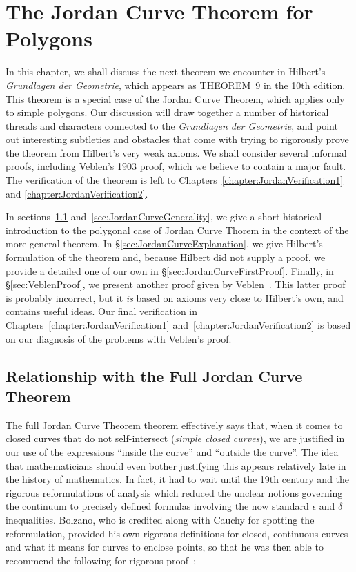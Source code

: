 \chapter{The Jordan Curve Theorem for Polygons}\label{chapter:JordanInformal}
In this chapter, we shall discuss the next theorem we encounter in Hilbert's \emph{Grundlagen der Geometrie}, which appears as THEOREM~9 in the 10th edition. This theorem is a special case of the Jordan Curve Theorem, which applies only to simple polygons. Our discussion will draw together a number of historical threads and characters connected to the \emph{Grundlagen der Geometrie}, and point out interesting subtleties and obstacles that come with trying to rigorously prove the theorem from Hilbert's very weak axioms. We shall consider several informal proofs, including Veblen's 1903 proof, which we believe to contain a major fault. The verification of the theorem is left to Chapters~\ref{chapter:JordanVerification1} and \ref{chapter:JordanVerification2}.

In sections~\ref{sec:JordanCurveHistory} and~\ref{sec:JordanCurveGenerality}, we give a short historical introduction to the polygonal case of Jordan Curve Thorem in the context of the more general theorem. In \S\ref{sec:JordanCurveExplanation}, we give Hilbert's formulation of the theorem and, because Hilbert did not supply a proof, we provide a detailed one of our own in \S\ref{sec:JordanCurveFirstProof}. Finally, in \S\ref{sec:VeblenProof}, we present another proof given by Veblen~\cite{Veblenphd}. This latter proof is probably incorrect, but it \emph{is} based on axioms very close to Hilbert's own, and contains useful ideas. Our final verification in Chapters~\ref{chapter:JordanVerification1} and~\ref{chapter:JordanVerification2} is based on our diagnosis of the problems with Veblen's proof.

\section{Relationship with the Full Jordan Curve Theorem}\label{sec:JordanCurveHistory}
The full Jordan Curve Theorem theorem effectively says that, when it comes to closed curves that do not self-intersect (\emph{simple closed curves}), we are justified in our use of the expressions ``inside the curve'' and ``outside the curve''. The idea that mathematicians should even bother justifying this appears relatively late in the history of mathematics. In fact, it had to wait until the 19th century and the rigorous reformulations of analysis which reduced the unclear notions governing the continuum to precisely defined formulas involving the now standard $\epsilon$ and $\delta$ inequalities. Bolzano, who is credited along with Cauchy for spotting the reformulation, provided his own rigorous definitions for closed, continuous curves and what it means for curves to enclose points, so that he was then able to recommend the following for rigorous proof~\cite{BolzanoJordan}:

